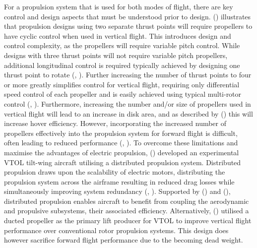 For a propulsion system that is used for both modes of flight, there are key control and design aspects that must be understood prior to design. \citeauthor{cetinsoy2012design} (\citeyear{cetinsoy2012design}) illustrates that propulsion designs using two separate thrust points will require propellers to have cyclic control when used in vertical flight. This introduces design and control complexity, as the propellers will require variable pitch control. While designs with three thrust points will not require variable pitch propellers, additional longitudinal control is required typically achieved by designing one thrust point to rotate (\citeauthor{monterroso2018preliminary}, \citeyear{monterroso2018preliminary}). Further increasing the number of thrust points to four or more greatly simplifies control for vertical flight, requiring only differential speed control of each propeller and is easily achieved using typical multi-rotor control (\citeauthor{cetinsoy2012design}, \citeyear{cetinsoy2012design}). Furthermore, increasing the number and/or size of propellers used in vertical flight will lead to an increase in disk area, and as described by \citeauthor{maisel2000history} (\citeyear{maisel2000history}) this will increase hover efficiency. However, incorporating the increased number of propellers effectively into the propulsion system for forward flight is difficult, often leading to reduced performance (\citeauthor{maisel2000history}, \citeyear{maisel2000history}). To overcome these limitations and maximise the advantages of electric propulsion, \citeauthor{rothhaar2014nasa} (\citeyear{rothhaar2014nasa}) developed an experimental VTOL tilt-wing aircraft utilising a distributed propulsion system. Distributed propulsion draws upon the scalability of electric motors, distributing the propulsion system across the airframe resulting in reduced drag losses while simultaneously improving system redundancy (\citeauthor{rothhaar2014nasa}, \citeyear{rothhaar2014nasa}). Supported by \citeauthor{ma2020sizing} (\citeyear{ma2020sizing}) and \citeauthor{matrone2019performance} (\citeyear{matrone2019performance}), distributed propulsion enables aircraft to benefit from coupling the aerodynamic and propulsive subsystems, their associated efficiency. Alternatively, \citeauthor{RN8} (\citeyear{RN8}) utilised a ducted propeller as the primary lift producer for VTOL to improve vertical flight performance over conventional rotor propulsion systems. This design does however sacrifice forward flight performance due to the becoming dead weight. \\

